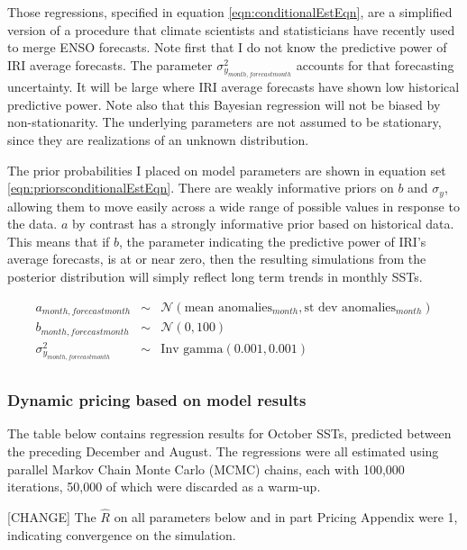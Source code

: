 \documentclass[authoryear]{article}
\begin{document}
Those regressions, specified in equation \ref{eqn:conditionalEstEqn}, are a simplified version of a procedure that climate scientists and statisticians have recently used to merge ENSO forecasts\cite{luo2007bayesian}\cite{coelho2004forecast}. Note first that I do not know the predictive power of IRI average forecasts. The parameter $\sigma_{y_{month,forecast month}}^2$ accounts for that forecasting uncertainty. It will be large where IRI average forecasts have shown low historical predictive power. Note also that this Bayesian regression will not be biased by non-stationarity. The underlying parameters are not assumed to be stationary, since they are realizations of an unknown distribution.

The prior probabilities I placed on model parameters are shown in equation set \ref{eqn:priorsconditionalEstEqn}. There are weakly informative priors on $b$ and $\sigma_{y}$, allowing them to move easily across a wide range of possible values in response to the data. $a$ by contrast has a strongly informative prior based on historical data. This means that if $b$, the parameter indicating the predictive power of IRI's average forecasts, is at or near zero, then the resulting simulations from the posterior distribution will simply reflect long term trends in monthly SSTs.

\begin{equation}
\begin{array}{lcl}
a_{month,forecast month}  & \sim & \mathcal{N}(\mbox{mean anomalies}_{month}, \mbox{st dev anomalies}_{month}) \\
b_{month,forecast month}  & \sim & \mathcal{N}(0, 100) \\
\sigma_{y_{month,forecast month}}^2 & \sim  &\mbox{Inv gamma}(0.001, 0.001) \\
\end{array}
\label{eqn:priorsconditionalEstEqn}
\end{equation}

\subsubsection{Dynamic pricing based on model results}
The table below contains regression results for October SSTs, predicted between the preceding December and August. The regressions were all estimated using parallel Markov Chain Monte Carlo (MCMC) chains, each with 100,000 iterations, 50,000 of which were discarded as a warm-up\cite{stan2013}. 

[CHANGE]
The $\hat{R}$ on all parameters below and in part Pricing Appendix were 1, indicating convergence on the simulation.
\end{document}
